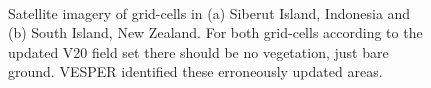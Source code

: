\documentclass[hess, twostagejnl]{copernicus}
\begin{document}
	\begin{figure}[h!]
	 \\
	\caption{Satellite imagery of grid-cells in (a) Siberut Island, Indonesia and (b) South Island, New Zealand. For both grid-cells according to the updated V20 field set there should be no vegetation, just bare ground. VESPER identified these erroneously updated areas.} 
	\label{fig:cvh}
\end{figure}
\end{document}
